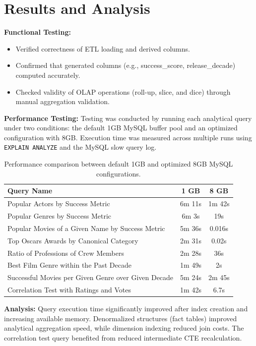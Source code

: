 \section{Results and Analysis}

\textbf{Functional Testing:}  
\begin{itemize}
	\item Verified correctness of ETL loading and derived columns.
	\item Confirmed that generated columns (e.g., success\_score, release\_decade) computed accurately.
	\item Checked validity of OLAP operations (roll-up, slice, and dice) through manual aggregation validation.
\end{itemize}

\textbf{Performance Testing:}  
Testing was conducted by running each analytical query under two conditions: the default 1GB MySQL buffer pool and an optimized configuration with 8GB. Execution time was measured across multiple runs using \texttt{EXPLAIN ANALYZE} and the MySQL slow query log.

\begin{table}[h!]
	\centering
	\begin{tabular}{|p{6cm}|c|c|}
		\hline
		\textbf{Query Name} & \textbf{1 GB} & \textbf{8 GB} \\
		\hline
		Popular Actors by Success Metric & 6m 11s & 1m 42s \\
		Popular Genres by Success Metric & 6m 3s & 19s \\
		Popular Movies of a Given Name by Success Metric & 5m 36s & 0.016s \\
		Top Oscars Awards by Canonical Category & 2m 31s & 0.02s \\
		Ratio of Professions of Crew Members & 2m 28s & 36s \\
		Best Film Genre within the Past Decade & 1m 49s & 2s \\
		Successful Movies per Given Genre over Given Decade & 5m 24s & 2m 45s \\
		Correlation Test with Ratings and Votes & 1m 42s & 6.7s \\
		\hline
	\end{tabular}
	\caption{Performance comparison between default 1GB and optimized 8GB MySQL configurations.}
\end{table}

\textbf{Analysis:}  
Query execution time significantly improved after index creation and increasing available memory.  
Denormalized structures (fact tables) improved analytical aggregation speed, while dimension indexing reduced join costs.  
The correlation test query benefited from reduced intermediate CTE recalculation.  

